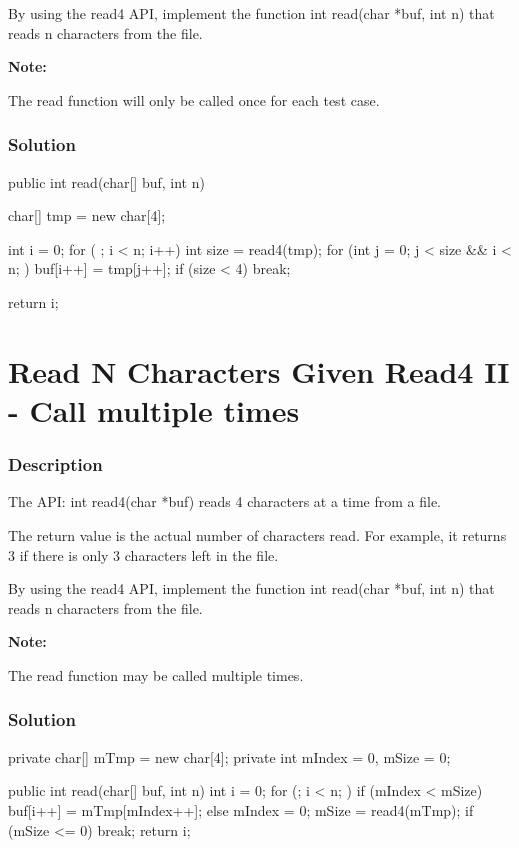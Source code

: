 By using the read4 API, implement the function int read(char *buf, int n) that reads n characters from the file.

\textbf{Note:}

The read function will only be called once for each test case.

\subsubsection{Solution}

\begin{Code}
public int read(char[] buf, int n) {
    char[] tmp = new char[4];

    int i = 0;
    for ( ; i < n; i++) {
        int size = read4(tmp);
        for (int j = 0; j < size && i < n; ) {
            buf[i++] = tmp[j++];
        }
        if (size < 4) {
            break;
        }
    }

    return i;
}
\end{Code}

\newpage

\section{Read N Characters Given Read4 II - Call multiple times} %

\subsubsection{Description}
The API: int read4(char *buf) reads 4 characters at a time from a file.

The return value is the actual number of characters read. For example, it returns 3 if there is only 3 characters left in the file.

By using the read4 API, implement the function int read(char *buf, int n) that reads n characters from the file.

\textbf{Note:}

The read function may be called multiple times.
\subsubsection{Solution}

\begin{Code}
private char[] mTmp = new char[4];
private int mIndex = 0, mSize = 0;

public int read(char[] buf, int n) {
    int i = 0;
    for (; i < n; ) {
        if (mIndex < mSize) {
            buf[i++] = mTmp[mIndex++];
        } else {
            mIndex = 0;
            mSize = read4(mTmp);
            if (mSize <= 0) {
                break;
            }
        }
    }
    return i;
}
\end{Code}

